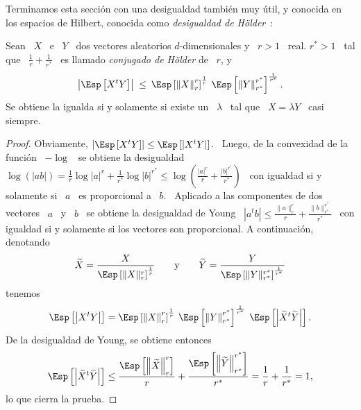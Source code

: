 Terminamos esta secci\'on  con una desigualdad tambi\'en muy  \'util, y conocida
en   los   espacios   de    Hilbert,   conocida   como   {\it   desigualdad   de
  H\"older}~\cite{Hol89, Sho29}:
%
\begin{teorema}
\label{Teo:MP:Holder}
%
Sean \ $X$ \  e \ $Y$ \ dos vectores aleatorios $d$-dimensionales y  \ $r > 1$ \
real. $r^* > 1$ \ tal que  \ $\frac1r + \frac1{r^*}$ \ es llamado {\it conjugado
  de H\"older} de \ $r$, y
  \[
  \left|  \Esp\left[  X^t Y  \right]  \right| \:  \le  \:  \Esp\left[ \left\|  X
    \right\|_r^r   \right]^{\frac1r}  \:  \Esp\left[   \left\|  Y
    \right\|_{r^*}^{r^*} \right]^{\frac1{r^*}}.
  \]
  Se obtiene la igualda si y solamente si existe un \ $\lambda$ \ tal que \ $X =
  \lambda Y$ \ casi siempre.
\end{teorema}
%
\begin{proof}
  Obviamente, $\left| \Esp\left[ X^t Y \right] \right| \le \Esp\left[ \left| X^t
      Y \right| \right]$. \ Luego, de  la convexidad de la funci\'on \ $-\log$ \
  se obtiene  la desigualdad \ $\log(|a  b|) = \frac1r \log  |a|^r + \frac1{r^*}
  \log |b|^{r^*} \le \log\left( \frac{|a|^r}{r} + \frac{|b|^{r^*}}{r^*} \right)$
  \ con igualdad si y solamente si \ $a$ \ es proporcional a \ $b$. \ Aplicado a
  las componentes de dos vectores \ $a$ \ y \ $b$ \ se obtiene la desigualdad de
  Young    \    $\left|    a^t    b   \right|    \le    \frac{\|a\|_r^r}{r}    +
  \frac{\|b\|_{r^*}^{r^*}}{r^*}$ \  con igualdad si y solamente  si los vectores
  son proporcional. A continuaci\'on, denotando
  \[
  \widetilde{X}         =         \frac{X}{\Esp\left[        \|X\|_r^r
    \right]^{\frac1r}}    \qquad    \mbox{y}    \qquad   \widetilde{Y}    =
  \frac{Y}{\Esp\left[ \|Y\|_{r^*}^{r^*} \right]^{\frac1{r^*}}}
  \]
  tenemos
  \[
  \Esp\left[   \left|   X^t  Y   \right|   \right]   =   \Esp\left[  \left\|   X
    \right\|_r^r   \right]^{\frac1r}  \:  \Esp\left[   \left\|  Y
    \right\|_{r^*}^{r^*}   \right]^{\frac1{r^*}}   \:  \Esp\left[
    \left| \widetilde{X}^t \widetilde{Y} \right| \right].
  \]
  De la desigualdad de Young, se obtiene entonces
  \[
  \Esp\left[   \left|   \widetilde{X}^t   \widetilde{Y}  \right|   \right]   \le
  \frac{\Esp\left[ \left\| \widetilde{X} \right\|_r^r \right]}{r}
  +   \frac{\Esp\left[   \left\|  \widetilde{Y}   \right\|_{r^*}^{r^*}
    \right]}{r^*} = \frac1r + \frac1{r^*} = 1,
  \]
  lo que cierra la prueba.
\end{proof}

